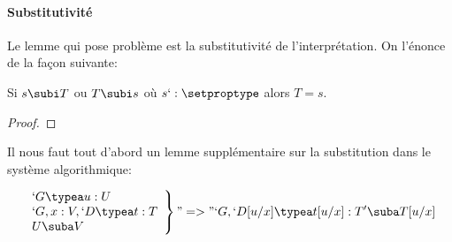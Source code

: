 \paragraph{Substitutivité}
Le lemme qui pose problème est la substitutivité de l'interprétation.
On l'énonce de la façon suivante:

\begin{lemma}
  \label{subi-sorts}
  Si $s \subi T$ ou $T \subi s$ où $s `: \setproptype$ alors $T = s$.
\end{lemma}
\begin{proof}
  \TODO{}
\end{proof}

\def\iu{\ip{u}{\iG}}
\def\tux{\ip{t[u/x]}{`G, `D[u/x]}}
\def\cux{[c~\ip{u}{`G}/x]}
\def\tcux{\ip{t}{\ipG{`G, x : V, `D}}[c~\ip{u}{`G}/x]}
\def\GD{`G, x : V, `D}
\def\Gr{`G, `D[u/x]}
\def\iGD{\ipG{`G, x : V, `D}}
\def\iGr{\ipG{`G, `D[u/x]}}


Il nous faut tout d'abord un lemme supplémentaire sur la substitution
dans le système algorithmique:

\begin{lemma}
  \label{subst-coerce-algo}
  \[\left.\begin{array}{l}
      `G \typea u : U \\
      \GD \typea t : T \\ 
      U \suba V
    \end{array}
\right\} "=>"    
`G, `D[u/x] \typea t[u/x] : T' \suba T[u/x]
    \]
\end{lemma}

